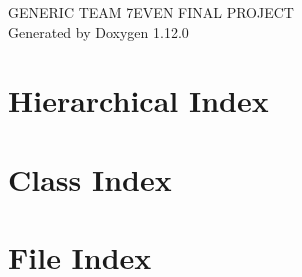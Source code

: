 \documentclass[twoside]{book}
\newcommand{\+}{\discretionary{\mbox{\scriptsize$\hookleftarrow$}}{}{}}
\newcommand{\clearemptydoublepage}{%
    \newpage{\pagestyle{empty}\cleardoublepage}%
  }
\begin{document}
  \raggedbottom
    \hypersetup{pageanchor=false,
                bookmarksnumbered=true,
                pdfencoding=unicode
               }
  \begin{titlepage}
  \vspace*{7cm}
  \begin{center}%
  {\Large GENERIC TEAM 7\+EVEN FINAL PROJECT}\\
  \vspace*{1cm}
  {\large Generated by Doxygen 1.12.0}\\
  \end{center}
  \end{titlepage}
  \clearemptydoublepage
  \tableofcontents
  \clearemptydoublepage
  \hypersetup{pageanchor=true}

\chapter{Hierarchical Index}

\chapter{Class Index}

\chapter{File Index}

\end{document}
